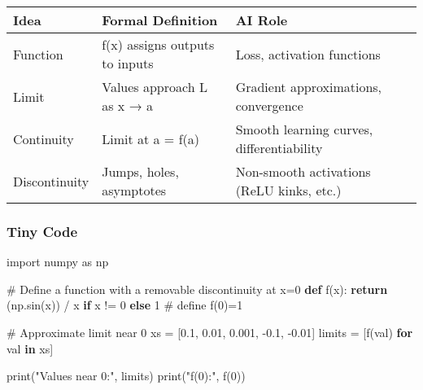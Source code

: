 \documentclass[
  letterpaper,
  DIV=11,
  numbers=noendperiod]{scrreprt}
\newenvironment{Shaded}{\begin{snugshade}}{\end{snugshade}}
\newcommand{\BuiltInTok}[1]{\textcolor[rgb]{0.00,0.23,0.31}{#1}}
\newcommand{\CommentTok}[1]{\textcolor[rgb]{0.37,0.37,0.37}{#1}}
\newcommand{\ControlFlowTok}[1]{\textcolor[rgb]{0.00,0.23,0.31}{\textbf{#1}}}
\newcommand{\DecValTok}[1]{\textcolor[rgb]{0.68,0.00,0.00}{#1}}
\newcommand{\FloatTok}[1]{\textcolor[rgb]{0.68,0.00,0.00}{#1}}
\newcommand{\ImportTok}[1]{\textcolor[rgb]{0.00,0.46,0.62}{#1}}
\newcommand{\KeywordTok}[1]{\textcolor[rgb]{0.00,0.23,0.31}{\textbf{#1}}}
\newcommand{\NormalTok}[1]{\textcolor[rgb]{0.00,0.23,0.31}{#1}}
\newcommand{\OperatorTok}[1]{\textcolor[rgb]{0.37,0.37,0.37}{#1}}
\newcommand{\StringTok}[1]{\textcolor[rgb]{0.13,0.47,0.30}{#1}}
\begin{document}
\begin{longtable}[]{@{}
  >{\raggedright\arraybackslash}p{}
  >{\raggedright\arraybackslash}p{}
  >{\raggedright\arraybackslash}p{}@{}}
\toprule\noalign{}
\begin{minipage}[b]{\linewidth}\raggedright
Idea
\end{minipage} & \begin{minipage}[b]{\linewidth}\raggedright
Formal Definition
\end{minipage} & \begin{minipage}[b]{\linewidth}\raggedright
AI Role
\end{minipage} \\
\midrule\noalign{}
\endhead
\bottomrule\noalign{}
\endlastfoot
Function & f(x) assigns outputs to inputs & Loss, activation
functions \\
Limit & Values approach L as x → a & Gradient approximations,
convergence \\
Continuity & Limit at a = f(a) & Smooth learning curves,
differentiability \\
Discontinuity & Jumps, holes, asymptotes & Non-smooth activations (ReLU
kinks, etc.) \\
\end{longtable}

\subsubsection{Tiny Code}\label{tiny-code-110}

\begin{Shaded}
\begin{Highlighting}[]
\ImportTok{import}\NormalTok{ numpy }\ImportTok{as}\NormalTok{ np}

\CommentTok{\# Define a function with a removable discontinuity at x=0}
\KeywordTok{def}\NormalTok{ f(x):}
    \ControlFlowTok{return}\NormalTok{ (np.sin(x)) }\OperatorTok{/}\NormalTok{ x }\ControlFlowTok{if}\NormalTok{ x }\OperatorTok{!=} \DecValTok{0} \ControlFlowTok{else} \DecValTok{1}  \CommentTok{\# define f(0)=1}

\CommentTok{\# Approximate limit near 0}
\NormalTok{xs }\OperatorTok{=}\NormalTok{ [}\FloatTok{0.1}\NormalTok{, }\FloatTok{0.01}\NormalTok{, }\FloatTok{0.001}\NormalTok{, }\OperatorTok{{-}}\FloatTok{0.1}\NormalTok{, }\OperatorTok{{-}}\FloatTok{0.01}\NormalTok{]}
\NormalTok{limits }\OperatorTok{=}\NormalTok{ [f(val) }\ControlFlowTok{for}\NormalTok{ val }\KeywordTok{in}\NormalTok{ xs]}

\BuiltInTok{print}\NormalTok{(}\StringTok{"Values near 0:"}\NormalTok{, limits)}
\BuiltInTok{print}\NormalTok{(}\StringTok{"f(0):"}\NormalTok{, f(}\DecValTok{0}\NormalTok{))}
\end{Highlighting}
\end{Shaded}
\end{document}
